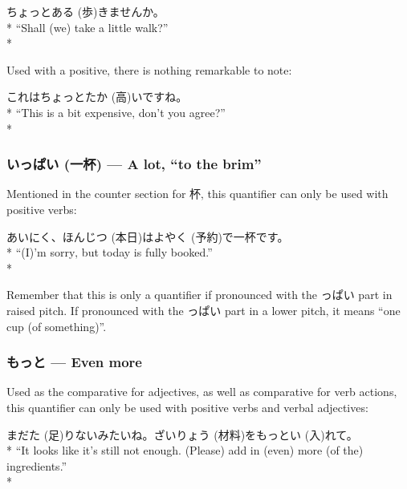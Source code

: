 \documentclass[11pt, b5paper, twoside, openright, onecolumn]{book}
\makeatletter
\newcommand*{\rubystack}[2]{{\relscale{0.5}%
  \begin{tabular}[b]{@{}c@{}}%
    {#1}\\%
   {\textscale{2}{#2}}%
  \end{tabular}}%
}
\DeclareRobustCommand*{\ruby}[2]{%
  \mbox{%
    \setlength{\parskip}{0ex}%
    \BeginAccSupp{method=pdfstringdef,ActualText={#1}}%
      \rubystack{\phantom{#2}}{#1}%
      \llap{%
        \rubystack{#2}{\phantom{#1}}%
      }%
    \EndAccSupp{}%
  }%
}
\renewcommand*{\ruby}[2]{#2 (#1)}%
\newenvironment{exampleblock}{
\setlength{\parindent}{0.6in}
\begin{minipage}[t]{\dimexpr\textwidth-\parindent}}
{\end{minipage}}
\makeatother
\begin{document}
\begin{exampleblock}
ちょっと\ruby{歩}{ある}きませんか。 \\* 
“Shall (we) take a little walk?” \\* 
\end{exampleblock}
\vspace{0.2cm}

Used with a positive‚ there is nothing remarkable to note:

\vspace{0.4cm}
\begin{exampleblock}
これはちょっと\ruby{高}{たか}いですね。 \\* 
“This is a bit expensive‚ don’t you agree?” \\* 
\end{exampleblock}
\subsubsection{\ruby{一杯}{いっぱい} — A lot‚ “to the brim”}


Mentioned in the counter section for 杯‚ this quantifier can only be used with positive verbs:

\vspace{0.4cm}
\begin{exampleblock}
あいにく、\ruby{本日}{ほんじつ}は\ruby{予約}{よやく}で一杯です。 \\* 
“(I)’m sorry‚ but today is fully booked.” \\* 
\end{exampleblock}
\vspace{0.2cm}

Remember that this is only a quantifier if pronounced with the っぱい part in raised pitch. If pronounced with the っぱい part in a lower pitch‚ it means “one cup (of something)”.

\subsubsection{もっと — Even more}

Used as the comparative for adjectives‚ as well as comparative for verb actions‚ this quantifier can only be used with positive verbs and verbal adjectives:

\vspace{0.4cm}
\begin{exampleblock}
まだ\ruby{足}{た}りないみたいね。\ruby{材料}{ざいりょう}をもっと\ruby{入}{い}れて。 \\* 
“It looks like it’s still not enough. (Please) add in (even) more (of the) ingredients.” \\* 
\end{exampleblock}
\end{document}
